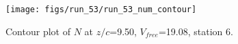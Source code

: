 \begin{figure}[H]
\centering
\texttt{[image: figs/run\_53/run\_53\_num\_contour]}
\caption{Contour plot of $N$ at $z/c$=9.50, $V_{free}$=19.08, station 6.}
\end{figure}


